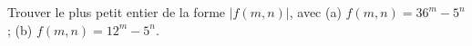 Trouver le plus petit entier de la forme $|f(m, n)|$, avec (a) $f(m, n) = 36^m - 5^n$ ; (b) $f(m, n) = 12^m - 5^n$.
